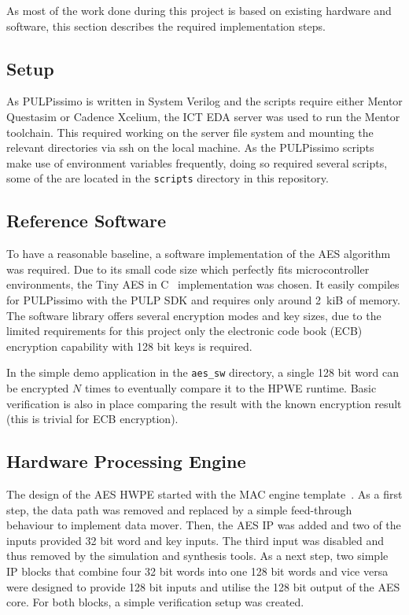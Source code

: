 \documentclass[a4paper, 12pt]{article}
\begin{document}
As most of the work done during this project is based on existing hardware and software, this section describes the required implementation steps.

\subsection{Setup}

As PULPissimo is written in System Verilog and the scripts require either Mentor Questasim or Cadence Xcelium, the ICT EDA server was used to run the Mentor toolchain. This required working on the server file system and mounting the relevant directories via ssh on the local machine. As the PULPissimo scripts make use of environment variables frequently, doing so required several scripts, some of the are located in the \verb|scripts| directory in this repository.

\subsection{Reference Software}

To have a reasonable baseline, a software implementation of the AES algorithm was required. Due to its small code size which perfectly fits microcontroller environments, the Tiny AES in C~\cite{tiny-aes-c} implementation was chosen. It easily compiles for PULPissimo with the PULP SDK and requires only around \SI{2}{kiB} of memory. The software library offers several encryption modes and key sizes, due to the limited requirements for this project only the electronic code book (ECB) encryption capability with 128 bit keys is required.

In the simple demo application in the \verb|aes_sw| directory, a single 128 bit word can be encrypted $N$ times to eventually compare it to the HPWE runtime. Basic verification is also in place comparing the result with the known encryption result (this is trivial for ECB encryption).

\subsection{Hardware Processing Engine}

The design of the AES HWPE started with the MAC engine template~\cite{hwpe-mac}. As a first step, the data path was removed and replaced by a simple feed-through behaviour to implement data mover. Then, the AES IP was added and two of the inputs provided 32 bit word and key inputs. The third input was disabled and thus removed by the simulation and synthesis tools. As a next step, two simple IP blocks that combine four 32 bit words into one 128 bit words and vice versa were designed to provide 128 bit inputs and utilise the 128 bit output of the AES core. For both blocks, a simple verification setup was created.
\end{document}
